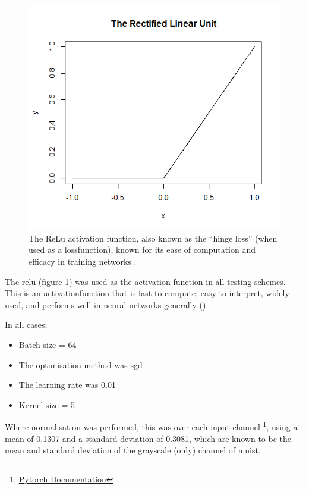 \begin{figure}
    \centering
    \includegraphics[scale=0.5]{figs/relu.png}
    \caption[The ReLu activation function.]{The ReLu activation function, also known as the \enquote{hinge loss} (when used as a \gls{lossfunction}), known for its ease of computation and efficacy in training networks \cite{activation_search}.}
    \label{fig:relu_function}
\end{figure}

The \gls{relu} (figure \ref{fig:relu_function}) was used as the activation function in all testing schemes. This is an \gls{activationfunction} that is fast to compute, easy to interpret, widely used, and performs well in neural networks generally (\cite{activation_search}). 
\bigskip

In all cases;

\begin{itemize}
    \itemsep-1em 
    \item Batch size = 64
    \item The optimisation method was \gls{sgd}
    \item The learning rate was 0.01
    \item Kernel size = 5
\end{itemize}

Where normalisation was performed, this was over each input channel \footnote{\href{https://pytorch.org/docs/stable/torchvision/transforms.html}{Pytorch Documentation}}, using a mean of 0.1307 and a standard deviation of 0.3081, which are known to be the mean and standard deviation of the grayscale (only) channel of \gls{mnist}.

